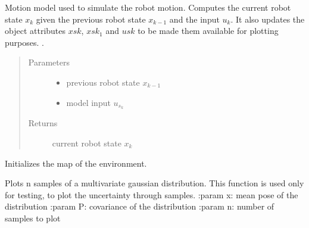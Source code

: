 \documentclass[letterpaper,10pt,english]{sphinxmanual}
\begin{document}
\begin{fulllineitems}
\begin{fulllineitems}
\label{\detokenize{robot_simulation:SimulatedRobot.SimulatedRobot.fs}}
\sphinxAtStartPar
Motion model used to simulate the robot motion. Computes the current robot state \(x_k\) given the previous robot state \(x_{k-1}\) and the input \(u_k\).
It also updates the object attributes \(xsk\), \(xsk_1\) and  \(usk\) to be made them available for plotting purposes.
.
\begin{quote}\begin{description}
\item[{Parameters}] \leavevmode\begin{itemize}
\item {} 
\sphinxAtStartPar
{} \textendash{} previous robot state \(x_{k-1}\)

\item {} 
\sphinxAtStartPar
{} \textendash{} model input \(u_{s_k}\)

\end{itemize}

\item[{Returns}] \leavevmode
\sphinxAtStartPar
current robot state \(x_k\)

\end{description}\end{quote}

\end{fulllineitems}


\begin{fulllineitems}
\label{\detokenize{robot_simulation:SimulatedRobot.SimulatedRobot.SetMap}}
\sphinxAtStartPar
Initializes the map of the environment.

\end{fulllineitems}


\begin{fulllineitems}
\label{\detokenize{robot_simulation:SimulatedRobot.SimulatedRobot._PlotSample}}
\sphinxAtStartPar
Plots n samples of a multivariate gaussian distribution. This function is used only for testing, to plot the
uncertainty through samples.
:param x: mean pose of the distribution
:param P: covariance of the distribution
:param n: number of samples to plot

\end{fulllineitems}


\end{fulllineitems}
\end{document}
